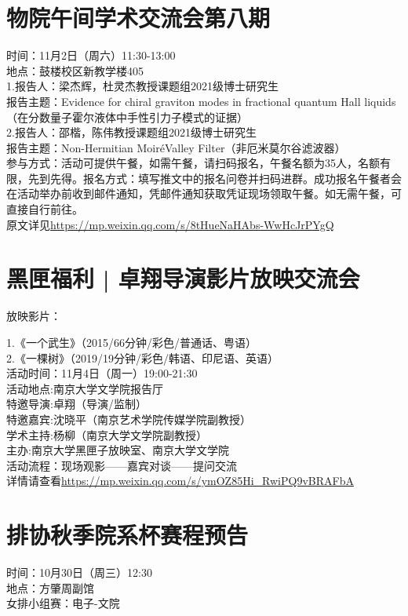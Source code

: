 \documentclass[letterpaper, 12pt]{article}
\begin{document}
\begin{multicols}{2}
\section{物院午间学术交流会第八期}
时间：11月2日（周六）11:30-13:00\\
地点：鼓楼校区新教学楼405\\
1.报告人：梁杰辉，杜灵杰教授课题组2021级博士研究生\\
报告主题：Evidence for chiral graviton modes in fractional quantum Hall liquids（在分数量子霍尔液体中手性引力子模式的证据）\\
2.报告人：邵楷，陈伟教授课题组2021级博士研究生\\
报告主题：Non-Hermitian MoiréValley Filter（非厄米莫尔谷滤波器）\\
参与方式：活动可提供午餐，如需午餐，请扫码报名，午餐名额为35人，名额有限，先到先得。报名方式：填写推文中的报名问卷并扫码进群。成功报名午餐者会在活动举办前收到邮件通知，凭邮件通知获取凭证现场领取午餐。如无需午餐，可直接自行前往。\\
原文详见\url{https://mp.weixin.qq.com/s/8tHueNaHAbs-WwHcJrPYgQ}

\section{黑匣福利 | 卓翔导演影片放映交流会}
放映影片：

1.《一个武生》（2015/66分钟/彩色/普通话、粤语）\\
2.《一棵树》（2019/19分钟/彩色/韩语、印尼语、英语）\\
活动时间：11月4日（周一）19:00-21:30\\
活动地点:南京大学文学院报告厅\\
特邀导演:卓翔（导演/监制）\\
特邀嘉宾:沈晓平（南京艺术学院传媒学院副教授）\\
学术主持:杨柳（南京大学文学院副教授）\\
主办:南京大学黑匣子放映室、南京大学文学院\\
活动流程：现场观影——嘉宾对谈——提问交流\\
详情请查看\url{https://mp.weixin.qq.com/s/ymOZ85Hi_RwiPQ9vBRAFbA}
\section{排协秋季院系杯赛程预告}
时间：10月30日（周三）12:30\\
地点：方肇周副馆\\
女排小组赛：电子-文院


\end{multicols}
\end{document}
